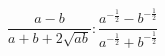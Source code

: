 \begin{ex}[type=expression]
	\begin{condition}
		\( \dfrac{a-b}{a+b+2\sqrt{ab}}:\dfrac{a^{-\frac{1}{2}}-b^{-\frac{1}{2}}}{a^{-\frac{1}{2}}+b^{-\frac{1}{2}}} \)
	\end{condition}
\end{ex}